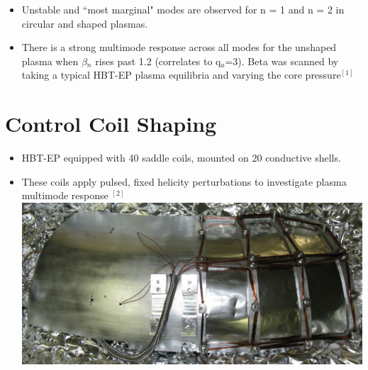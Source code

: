 \documentclass{article}
\begin{document}
\begin{multicols}{5}
\begin{itemize}
\item Unstable and ``most marginal" modes are observed for n = 1 and n = 2 in circular and shaped plasmas. 
\item There is a strong multimode response across all modes for the unshaped plasma when  $\beta$$_n$ rises past 1.2 (correlates to q$_a$=3).  Beta was scanned by taking a typical HBT-EP plasma equilibria and varying the core pressure$^{[1]}$


\end{itemize}

\section{Control Coil Shaping}
\begin{itemize}

\item HBT-EP equipped with 40 saddle coils, mounted on 20 conductive shells. 
\item These coils apply pulsed, fixed helicity perturbations to investigate plasma multimode response $^{[2]}$\\

\includegraphics[width=0.9\columnwidth]{control_shell}\\


\end{itemize}
\end{multicols}
\end{document}
